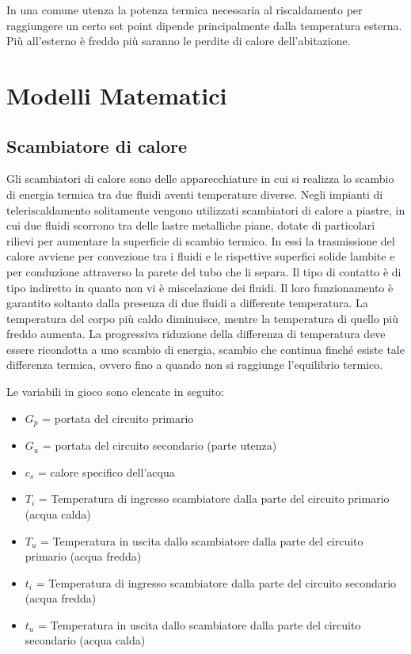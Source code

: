 \documentclass[laurea,oneside,11pt]{USiena_tesiLM}
\begin{document}
In una comune utenza la potenza termica necessaria al riscaldamento per raggiungere un certo set point dipende principalmente dalla temperatura esterna. Più all'esterno è freddo più saranno le perdite di calore dell'abitazione.




\chapter{Modelli Matematici}

\section{Scambiatore di calore}
\label{subsec:scambiatore_di_calore}
Gli scambiatori di calore sono  delle apparecchiature in cui si realizza lo scambio di energia termica tra due fluidi aventi temperature diverse. Negli impianti di teleriscaldamento solitamente vengono utilizzati scambiatori di calore a piastre, in cui due fluidi scorrono tra delle lastre metalliche piane, dotate di particolari rilievi per aumentare la superficie di scambio termico. In essi la trasmissione del calore avviene per convezione tra i fluidi e le rispettive superfici solide lambite e per conduzione attraverso la parete del tubo che li separa. Il tipo di contatto è di tipo indiretto in quanto non vi è miscelazione dei fluidi.
Il loro funzionamento è garantito soltanto dalla presenza di due fluidi a differente temperatura. La temperatura del corpo più caldo diminuisce, mentre la temperatura di quello più freddo aumenta. La progressiva riduzione della differenza di temperatura deve essere ricondotta a uno scambio di energia, scambio che continua finché esiste tale differenza termica, ovvero fino a quando non si raggiunge l'equilibrio termico. 

Le variabili in gioco sono elencate in seguito:
\begin{itemize}
\item[] $G_p$ = portata del circuito primario
\item[]$G_u$ = portata del circuito secondario (parte utenza)
\item[]$c_s$ = calore specifico dell'acqua
\item[]$T_i$ = Temperatura di ingresso scambiatore dalla parte del circuito primario (acqua calda)
\item[]$T_u$ = Temperatura in uscita dallo scambiatore dalla parte del circuito primario (acqua fredda)
\item[]$t_i$ = Temperatura di ingresso scambiatore dalla parte del circuito secondario (acqua fredda)
\item[]$t_u$ = Temperatura in uscita dallo scambiatore dalla parte del circuito secondario (acqua calda)
\end{itemize}
\end{document}
